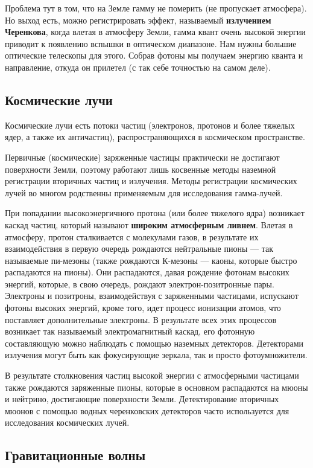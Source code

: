 Проблема тут в том, что на Земле гамму не померить (не пропускает атмосфера). Но выход есть, можно регистрировать эффект, называемый \textbf{излучением Черенкова}, когда влетая в атмосферу Земли, гамма квант очень высокой энергии приводит к появлению вспышки в оптическом диапазоне. Нам нужны большие оптические телескопы для этого. Собрав фотоны мы получаем энергию кванта и направление, откуда он прилетел (с так себе точностью на самом деле).

\subsection{Космические лучи}

Космические лучи есть потоки частиц (электронов, протонов и более тяжелых ядер, а также их античастиц), распространяющихся в космическом пространстве.

Первичные (космические) заряженные частицы практически не достигают поверхности Земли, поэтому работают лишь косвенные методы наземной регистрации вторичных частиц и излучения. Методы регистрации космических лучей во многом родственны применяемым для исследования гамма-лучей.

При попадании высокоэнергичного протона (или более тяжелого ядра) возникает каскад частиц, который называют \textbf{широким атмосферным ливнем}. Влетая в атмосферу, протон сталкивается с молекулами газов, в результате их взаимодействия в первую очередь рождаются нейтральные пионы — так называемые пи-мезоны (также рождаются К-мезоны — каоны, которые быстро распадаются на пионы). Они распадаются, давая рождение фотонам высоких энергий, которые, в свою очередь, рождают электрон-позитронные пары. Электроны и позитроны, взаимодействуя с заряженными частицами, испускают фотоны высоких энергий, кроме того, идет процесс ионизации атомов, что поставляет дополнительные электроны. В результате всех этих процессов возникает так называемый электромагнитный каскад, его фотонную составляющую можно наблюдать с помощью наземных детекторов. Детекторами излучения могут быть как фокусирующие зеркала, так и просто фотоумножители. 

В результате столкновения частиц высокой энергии с атмосферными частицами также рождаются заряженные пионы, которые в основном распадаются на мюоны и нейтрино, достигающие поверхности Земли. Детектирование вторичных мюонов с помощью водных черенковских детекторов часто используется для исследования космических лучей.

\subsection{Гравитационные волны}

